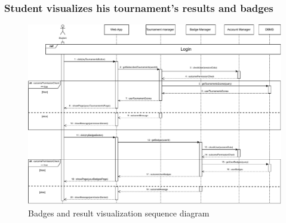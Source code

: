 \documentclass{article}
\begin{document}
{    \subsubsection{Student visualizes his tournament's results and badges}
        \begin{figure}[H] 
            \centering
            \hspace*{-2.4cm}\includegraphics[scale=0.65]{Sequence/Sequence13DD.pdf}
            \caption{Badges and result visualization sequence diagram}
            \label{fig:Sequence13DD}
        \end{figure}

        

}
\end{document}
